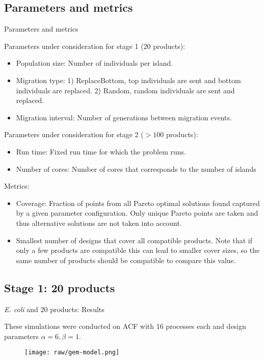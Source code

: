 \documentclass[8pt]{beamer}
\begin{document}
\subsection{Parameters and metrics}
\begin{frame}{Parameters and metrics}

    Parameters under consideration for stage 1 (20 products):
\begin{itemize}
    \item Population size: Number of individuals per island.
    \item Migration type: 1) ReplaceBottom, top individuals are sent and bottom individuals are replaced. 2) Random, random individuals are sent and replaced.

    \item Migration interval: Number of generations between migration events.
\end{itemize}
    Parameters under consideration for stage 2 ($>100$ products):
\begin{itemize}
    \item Run time: Fixed run time for which the problem runs.
    \item Number of cores: Number of cores that corresponds to the number of islands
\end{itemize}
    Metrics:
\begin{itemize}
    \item Coverage: Fraction of points from all Pareto optimal solutions found captured by a given parameter configuration. Only unique Pareto points are taken and thus alternative solutions are not taken into account.
    \item Smallest number of designs that cover all compatible products. Note that if only a few products are compatible this can lead to smaller cover sizes, so the same number of products should be compatible to compare this value.
\end{itemize}
\end{frame}

\subsection{Stage 1: 20 products}

\begin{frame}{\protect\textit{E. coli} and 20 products: Results}

These simulations were conducted on ACF with 16 processes each and design parameters $\alpha=6,\beta=1$.

\begin{figure}
    \centering
    \texttt{[image: raw/gem-model.png]}
\end{figure}
\end{frame}
\end{document}
